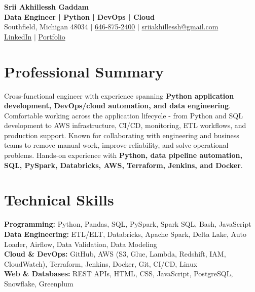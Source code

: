 \documentclass[letterpaper,10pt]{article}
\begin{document}
\fontsize{9.35pt}{10.45pt}\selectfont

\begin{center}
    {\LARGE \textbf{Srii Akhillessh Gaddam}} \\[-1pt]
    \textbf{Data Engineer | Python | DevOps | Cloud} \\[2pt]
    Southfield, Michigan 48034 $|$
    \href{tel:6468752400}{646-875-2400} $|$
    \href{mailto:sriiakhillessh@gmail.com}{sriiakhillessh@gmail.com} \\[1pt]
    \href{https://www.linkedin.com/in/srii-akhiilessh-gaddam-b48668191/}{LinkedIn} $|$
    \href{https://sriiakhillesshg.github.io/portfolio/}{Portfolio}
\end{center}
\vspace{-8pt}

\section{Professional Summary}
\small{Cross-functional engineer with experience spanning \textbf{Python application development, DevOps/cloud automation, and data engineering}. Comfortable working across the application lifecycle - from Python and SQL development to AWS infrastructure, CI/CD, monitoring, ETL workflows, and production support. Known for collaborating with engineering and business teams to remove manual work, improve reliability, and solve operational problems. Hands-on experience with \textbf{Python, data pipeline automation, SQL, PySpark, Databricks, AWS, Terraform, Jenkins, and Docker}.}

\section{Technical Skills}
\small{
\textbf{Programming:} Python, Pandas, SQL, PySpark, Spark SQL, Bash, JavaScript \\
\textbf{Data Engineering:} ETL/ELT, Databricks, Apache Spark, Delta Lake, Auto Loader, Airflow, Data Validation, Data Modeling \\
\textbf{Cloud \& DevOps:} GitHub, AWS (S3, Glue, Lambda, Redshift, IAM, CloudWatch), Terraform, Jenkins, Docker, Git, CI/CD, Linux \\
\textbf{Web \& Databases:} REST APIs, HTML, CSS, JavaScript, PostgreSQL, Snowflake, Greenplum
}

\end{document}

